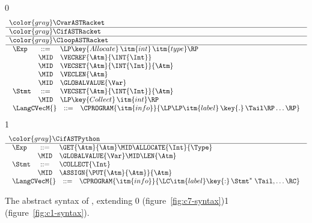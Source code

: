 \documentclass[7x10]{TimesAPriori_MIT}%
\newcommand{\gray}[1]{{\color{gray} #1}}
\def\racketEd{0}
\def\pythonEd{1}
\def\edition{1}
\newcommand{\racket}[1]{{\if\edition\racketEd{#1}\fi}}
\newcommand{\pythonColor}[0]{}
\newcommand{\python}[1]{{\if\edition\pythonEd\pythonColor #1\fi}}
\numberwithin{theorem}{chapter}
\numberwithin{definition}{chapter}
\numberwithin{equation}{chapter}
\begin{document}
\newcommand{\CtupASTRacket}{
\begin{array}{lcl}
\Exp &::= & \LP\key{Allocate} \,\itm{int}\,\itm{type}\RP \\
   &\MID& \VECREF{\Atm}{\INT{\Int}}  \\
   &\MID& \VECSET{\Atm}{\INT{\Int}}{\Atm} \\
   &\MID& \VECLEN{\Atm} \\
   &\MID& \GLOBALVALUE{\Var} \\
\Stmt &::=& \VECSET{\Atm}{\INT{\Int}}{\Atm} \\
    &\MID& \LP\key{Collect} \,\itm{int}\RP 
\end{array}
}
  
\newcommand{\CtupASTPython}{
\begin{array}{lcl}
\Exp &::= & \GET{\Atm}{\Atm} \MID \ALLOCATE{\Int}{\Type} \\
      &\MID& \GLOBALVALUE{\Var} \MID \LEN{\Atm} \\
\Stmt &::=& \COLLECT{\Int} \\
     &\MID& \ASSIGN{\PUT{\Atm}{\Atm}}{\Atm} 
\end{array}
}

\begin{figure}[tp]
  \begin{tcolorbox}[colback=white]
    \small
{\if\edition\racketEd    
\[
\begin{array}{l}
  \gray{\CvarASTRacket} \\ \hline
  \gray{\CifASTRacket} \\ \hline
  \gray{\CloopASTRacket} \\ \hline
  \CtupASTRacket \\
  \begin{array}{lcl}
    \LangCVecM{} & ::= & \CPROGRAM{\itm{info}}{\LP\LP\itm{label}\,\key{.}\,\Tail\RP\ldots\RP}
  \end{array}
\end{array}
\]
\fi}
{\if\edition\pythonEd\pythonColor
\[
\begin{array}{l}
  \gray{\CifASTPython} \\ \hline
  \CtupASTPython \\
\begin{array}{lcl}
\LangCVecM{} & ::= & \CPROGRAM{\itm{info}}{\LC\itm{label}\key{:}\,\Stmt^{*}\;\Tail, \ldots \RC}
\end{array}
\end{array}
\]
\fi}
  \end{tcolorbox}

\caption{The abstract syntax of \LangCVec{}, extending
  \racket{\LangCLoop{} (figure~\ref{fig:c7-syntax})}\python{\LangCIf{}
  (figure~\ref{fig:c1-syntax})}.}
\label{fig:c2-syntax}
\end{figure}
\end{document}

